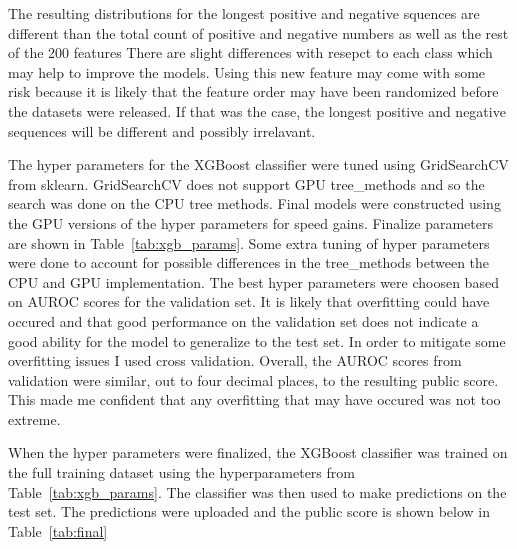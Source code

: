 \documentclass[11pt,letterpaper]{article}
\begin{document}
The resulting distributions for the longest positive and negative squences are
different than the total count of positive and negative numbers as well as the
rest of the 200 features There are slight differences with resepct to each class
which may help to improve the models.  Using this new feature may come with some
risk because it is likely that the feature order may have been randomized before
the datasets were released.  If that was the case, the longest positive and
negative sequences will be different and possibly irrelavant.

The hyper parameters for the XGBoost classifier were tuned using GridSearchCV
from sklearn.  GridSearchCV does not support GPU tree\_methods and so the search
was done on the CPU tree methods.  Final models were constructed using the GPU
versions of the hyper parameters for speed gains.  Finalize parameters are shown
in Table~\ref{tab:xgb_params}.  Some extra tuning of hyper parameters were done
to account for possible differences in the tree\_methods between the CPU and GPU
implementation.  The best hyper parameters were choosen based on AUROC scores
for the validation set.  It is likely that overfitting could have occured and
that good performance on the validation set does not indicate a good ability for
the model to generalize to the test set.  In order to mitigate some overfitting
issues I used cross validation.  Overall, the AUROC scores from validation were
similar, out to four decimal places, to the resulting public score.  This made
me confident that any overfitting that may have occured was not too extreme.

\begin{table}[h!]
\centering
\caption{XGBoost final hyper parameters}
\label{tab:xgb_params}
\end{table}

When the hyper parameters were finalized, the XGBoost classifier was trained on
the full training dataset using the hyperparameters from
Table~\ref{tab:xgb_params}.  The classifier was then used to make predictions on
the test set.  The predictions were uploaded and the public score is shown below
in Table~\ref{tab:final}
\end{document}
